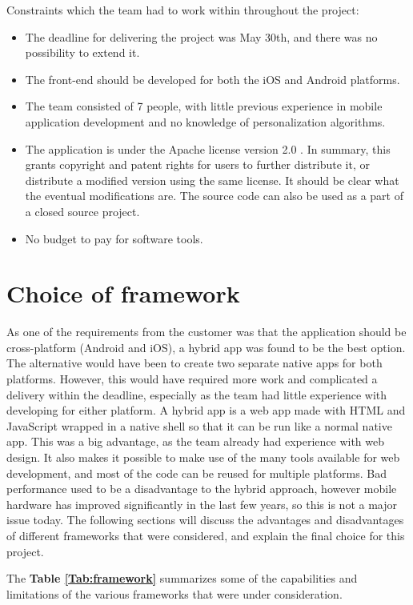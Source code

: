 Constraints which the team had to work within throughout the project:
\begin{itemize}
\item The deadline for delivering the project was May 30th, and there was no possibility to extend it.
\item The front-end should be developed for both the iOS and Android platforms.
\item The team consisted of 7 people, with little previous experience in mobile application development and no knowledge of personalization algorithms.
\item The application is under the Apache license version 2.0 \cite{HM7}. In summary, this grants copyright and patent rights for users to further distribute it, or distribute a modified version using the same license. It should be clear what the eventual modifications are. The source code can also be used as a part of a closed source project.
\item No budget to pay for software tools.
\end{itemize}

\section{Choice of framework}

As one of the requirements from the customer was that the application should be cross-platform (Android and iOS), a hybrid app was found to be the best option. The alternative would have been to create two separate native apps for both platforms. However, this would have required more work and complicated a delivery within the deadline, especially as the team had little experience with developing for either platform. A hybrid app is a web app made with HTML and JavaScript wrapped in a native shell so that it can be run like a normal native app. This was a big advantage, as the team already had experience with web design. It also makes it possible to make use of the many tools available for web development, and most of the code can be reused for multiple platforms. Bad performance used to be a disadvantage to the hybrid approach, however mobile hardware has improved significantly in the last few years, so this is not a major issue today. The following sections will discuss the advantages and disadvantages of different frameworks that were considered, and explain the final choice for this project. \newline

The \textbf{Table \ref{Tab:framework}} summarizes some of the capabilities and limitations of the various frameworks that were under consideration.

